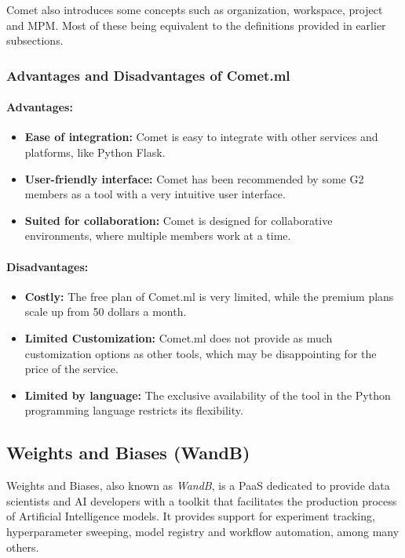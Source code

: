 Comet also introduces some concepts such as organization, workspace, project and \acrfull{MPM}. Most of these being equivalent to the definitions provided in earlier
subsections.

\subsubsection{Advantages and Disadvantages of Comet.ml\cite{cometmlproscons}}

\paragraph{Advantages: }

\begin{itemize}
    \item \textbf{Ease of integration: }Comet is easy to integrate with other services and platforms, like Python Flask.
    \item \textbf{User-friendly interface: }Comet has been recommended by some G2 members as a tool with a very intuitive user interface.
    \item \textbf{Suited for collaboration: }Comet is designed for collaborative environments, where multiple members work at a time.
\end{itemize}

\paragraph{Disadvantages: }

\begin{itemize}
    \item \textbf{Costly: }The free plan of Comet.ml is very limited, while the premium plans scale up from 50 dollars a month.
    \item \textbf{Limited Customization: }Comet.ml does not provide as much customization options as other tools, which may be disappointing for the price of the 
    service.
    \item \textbf{Limited by language: }The exclusive availability of the tool in the Python programming language restricts its flexibility.
\end{itemize}

\subsection{Weights and Biases (WandB)}

Weights and Biases, also known as \emph{WandB}, is a \acrshort{PaaS} dedicated to provide data scientists and AI developers with a toolkit that facilitates the production
process of Artificial Intelligence models. It provides support for experiment tracking, hyperparameter sweeping, model registry and workflow automation, among many 
others.

